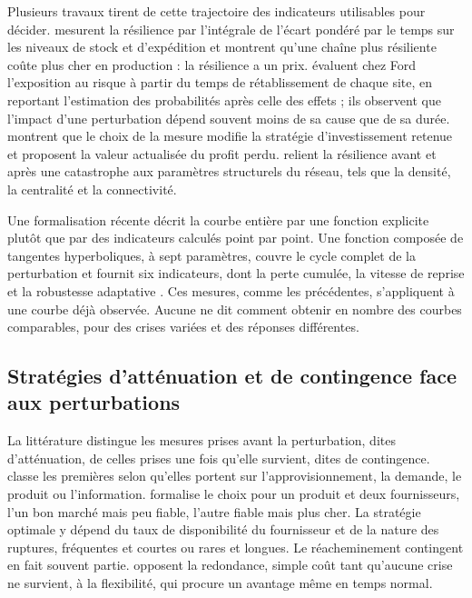 Plusieurs travaux tirent de cette trajectoire des indicateurs utilisables pour décider. \citet{spiegler2012} mesurent la résilience par l'intégrale de l'écart pondéré par le temps sur les niveaux de stock et d'expédition et montrent qu'une chaîne plus résiliente coûte plus cher en production : la résilience a un prix. \citet{simchilevi2015} évaluent chez Ford l'exposition au risque à partir du temps de rétablissement de chaque site, en reportant l'estimation des probabilités après celle des effets ; ils observent que l'impact d'une perturbation dépend souvent moins de sa cause que de sa durée. \citet{behzadi2020} montrent que le choix de la mesure modifie la stratégie d'investissement retenue et proposent la valeur actualisée du profit perdu. \citet{dixit2020} relient la résilience avant et après une catastrophe aux paramètres structurels du réseau, tels que la densité, la centralité et la connectivité.

Une formalisation récente décrit la courbe entière par une fonction explicite plutôt que par des indicateurs calculés point par point. Une fonction composée de tangentes hyperboliques, à sept paramètres, couvre le cycle complet de la perturbation et fournit six indicateurs, dont la perte cumulée, la vitesse de reprise et la robustesse adaptative \citep{rahiel2026in4pl, rahiel2026these}. Ces mesures, comme les précédentes, s'appliquent à une courbe déjà observée. Aucune ne dit comment obtenir en nombre des courbes comparables, pour des crises variées et des réponses différentes.

\subsection{Stratégies d'atténuation et de contingence face aux perturbations}
\label{sec:ea-strategies}

La littérature distingue les mesures prises avant la perturbation, dites d'atténuation, de celles prises une fois qu'elle survient, dites de contingence. \citet{tang2006} classe les premières selon qu'elles portent sur l'approvisionnement, la demande, le produit ou l'information. \citet{tomlin2006} formalise le choix pour un produit et deux fournisseurs, l'un bon marché mais peu fiable, l'autre fiable mais plus cher. La stratégie optimale y dépend du taux de disponibilité du fournisseur et de la nature des ruptures, fréquentes et courtes ou rares et longues. Le réacheminement contingent en fait souvent partie. \citet{sheffirice2005} opposent la redondance, simple coût tant qu'aucune crise ne survient, à la flexibilité, qui procure un avantage même en temps normal.

